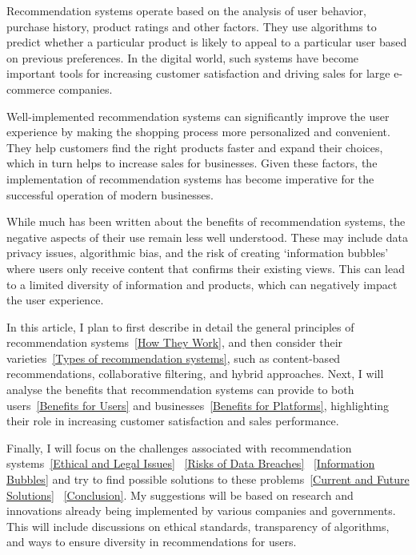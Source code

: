 \documentclass[10pt,twoside,slovak,a4paper]{article}
\begin{document}
Recommendation systems operate based on the analysis of user behavior, purchase history, product ratings and other factors. They use algorithms to predict whether a particular product is likely to appeal to a particular user based on previous preferences. In the digital world, such systems have become important tools for increasing customer satisfaction and driving sales for large e-commerce companies\cite{store}.

Well-implemented recommendation systems can significantly improve the user experience\cite{experience} by making the shopping process more personalized\cite{closeness} and convenient. They help customers find the right products faster and expand their choices, which in turn helps to increase sales for businesses\cite{comerce}. Given these factors, the implementation of recommendation systems has become imperative for the successful operation of modern businesses\cite{comerce}.


While much has been written about the benefits of recommendation systems, the negative aspects of their use remain less well understood. These may include data privacy issues, algorithmic bias, and the risk of creating ‘information bubbles’\cite{boubble} where users only receive content that confirms their existing views. This can lead to a limited diversity of information and products\cite{trouble}, which can negatively impact the user experience.

In this article, I plan to first describe in detail the general principles of recommendation systems~\ref{How They Work}, and then consider their varieties~\ref{Types of recommendation systems}, such as content-based recommendations, collaborative filtering, and hybrid approaches. Next, I will analyse the benefits that recommendation systems can provide to both users~\ref{Benefits for Users} and businesses~\ref{Benefits for Platforms}, highlighting their role in increasing customer satisfaction and sales performance.

Finally, I will focus on the challenges associated with recommendation systems~\ref{Ethical and Legal Issues} ~\ref{Risks of Data Breaches} ~\ref{Information Bubbles} and try to find possible solutions to these problems~\ref{Current and Future Solutions} ~\ref{Conclusion}. My suggestions will be based on research and innovations already being implemented by various companies and governments. This will include discussions on ethical standards, transparency of algorithms, and ways to ensure diversity in recommendations for users.
\end{document}
